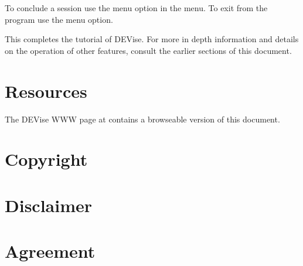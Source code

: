 To conclude a session use the  menu option in the 
menu. To exit from the program use the  menu option.

This completes the tutorial of DEVise. For more in depth information and details
on the operation of other features, consult the earlier sections of this
document.


\section{Resources}

The DEVise WWW page at  contains a
browseable version of this document.


\newpage 
\section*{Copyright}



\section*{Disclaimer}



\newpage
\section*{Agreement}





